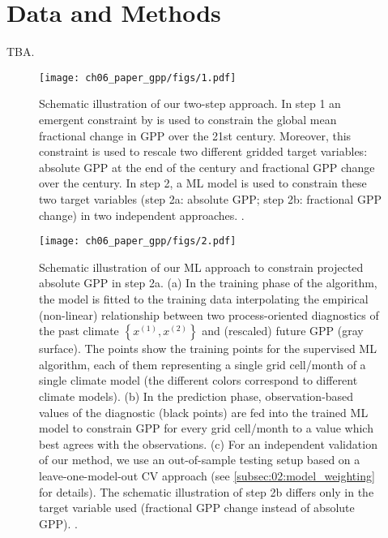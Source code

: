 \section{Data and Methods}
\label{sec:06:data_and_methods}

TBA.

\begin{figure}[t]
  \centering
  \texttt{[image: ch06\_paper\_gpp/figs/1.pdf]}
  \caption{Schematic illustration of our two-step approach. In step 1 an
    emergent constraint by \textcite{Wenzel2016} is used to constrain the
    global mean fractional change in \acf{GPP} over the 21st century.
    Moreover, this constraint is used to rescale two different gridded target
    variables: absolute \acs{GPP} at the end of the  century and
    fractional \acs{GPP} change over the  century. In step 2, a
    \acl{ML} model is used to constrain these two target variables (step 2a:
    absolute \acs{GPP}; step 2b: fractional \acs{GPP} change) in two
    independent approaches. .}
  \label{fig:06:schematic_steps}
\end{figure}

\begin{figure}[p]
  \centering
  \texttt{[image: ch06\_paper\_gpp/figs/2.pdf]}
  \caption{Schematic illustration of our \acf{ML} approach to constrain
    projected absolute \acf{GPP} in step 2a. (a) In the training phase of the
    algorithm, the model is fitted to the training data interpolating the
    empirical (non-linear) relationship between two process-oriented
    diagnostics of the past climate $\left\{ x^{(1)}, x^{(2)} \right\}$ and
    (rescaled) future \acs{GPP} (gray surface). The points show the training
    points for the supervised \acs{ML} algorithm, each of them representing a
    single grid cell/month of a single climate model (the different colors
    correspond to different climate models). (b) In the prediction phase,
    observation-based values of the diagnostic (black points) are fed into the
    trained \acs{ML} model to constrain \acs{GPP} for every grid cell/month to
    a value which best agrees with the observations. (c) For an independent
    validation of our method, we use an out-of-sample testing setup based on a
    leave-one-model-out \acl{CV} approach (see
    \cref{subsec:02:model_weighting} for details). The schematic illustration
    of step 2b differs only in the target variable used (fractional \acs{GPP}
    change instead of absolute \acs{GPP}). .}
  \label{fig:06:mlr_concept}
\end{figure}

